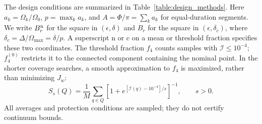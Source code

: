 The design conditions are summarized in Table~\ref{table:design_methods}.
Here $a_k=\Omega_k/\Omega_0$, $p=\max_k a_k$, and $A=\Phi/\pi=\sum_k a_k$ for equal-duration segments. We write $B_r^{\rm n}$ for the square in $(\epsilon,\delta)$ and $B_r$ for the square in $(\epsilon,\delta_c)$, where $\delta_c=\Delta/\Omega_{\max}=\delta/p$. A superscript n or c on a mean or threshold fraction specifies these two coordinates. The threshold fraction $f_4$ counts samples with $\mathcal I\leq10^{-4}$; $f_4^{(0)}$ restricts it to the connected component containing the nominal point. In the shorter coverage searches, a smooth approximation to $f_4$ is maximized, rather than minimizing $J_w$:
\[
S_s(Q)=\frac1M\sum_{q\in Q}\left[1+e^{[\mathcal I(q)-10^{-4}]/s}\right]^{-1},\qquad s>0.
\] All averages and protection conditions are sampled; they do not certify continuum bounds.


